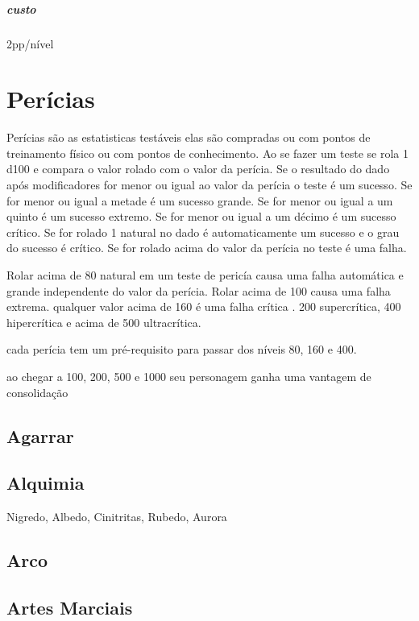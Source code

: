 \paragraph{custo} 2pp/nível
%
%
%
%
\chapter{Perícias}
Perícias são as estatisticas testáveis elas são compradas ou com pontos de treinamento físico ou com pontos de conhecimento.
Ao se fazer um teste se rola 1 d100 e compara o valor rolado com o valor da perícia.
Se o resultado do dado após modificadores for menor ou igual ao valor da perícia o teste é um sucesso.
Se for menor ou igual a metade é um sucesso grande.
Se for menor ou igual a um quinto é um sucesso extremo.
Se for menor ou igual a um décimo é um sucesso crítico.
Se for rolado 1 natural no dado é automaticamente um sucesso e o grau do sucesso é crítico.
Se for rolado acima do valor da perícia no teste é uma falha.

Rolar acima de 80 natural em um teste de pericía causa uma falha automática e grande independente do valor da perícia.
Rolar acima de 100 causa uma falha extrema. qualquer valor acima de 160 é uma falha crítica .
200 supercrítica, 400 hipercrítica e acima de 500 ultracrítica.

cada perícia tem um pré-requisito para passar dos níveis 80, 160 e 400.

ao chegar a 100, 200, 500 e 1000 seu personagem ganha uma vantagem de consolidação

%
%
\section{Agarrar}
\section{Alquimia} Nigredo, Albedo, Cinitritas, Rubedo, Aurora
\section{Arco}
\section{Artes Marciais}
